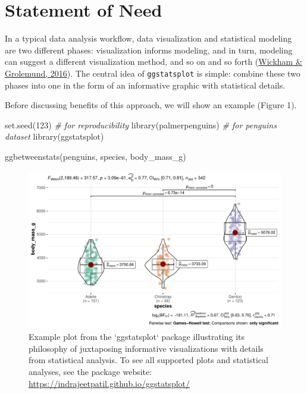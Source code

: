 \documentclass[10pt,a4paper,onecolumn]{article}
\newenvironment{Shaded}{\begin{snugshade}}{\end{snugshade}}
\newcommand{\CommentTok}[1]{\textcolor[rgb]{0.56,0.35,0.01}{\textit{#1}}}
\newcommand{\DecValTok}[1]{\textcolor[rgb]{0.00,0.00,0.81}{#1}}
\newcommand{\FunctionTok}[1]{\textcolor[rgb]{0.00,0.00,0.00}{#1}}
\newcommand{\NormalTok}[1]{#1}
\begin{document}
\hypertarget{statement-of-need}{%
\section{Statement of Need}\label{statement-of-need}}

In a typical data analysis workflow, data visualization and statistical
modeling are two different phases: visualization informs modeling, and
in turn, modeling can suggest a different visualization method, and so
on and so forth (\protect\hyperlink{ref-wickham2016r}{Wickham \&
Grolemund, 2016}). The central idea of \texttt{ggstatsplot} is simple:
combine these two phases into one in the form of an informative graphic
with statistical details.

Before discussing benefits of this approach, we will show an example
(Figure 1).

\begin{Shaded}
\begin{Highlighting}[]
\FunctionTok{set.seed}\NormalTok{(}\DecValTok{123}\NormalTok{) }\CommentTok{\# for reproducibility}
\FunctionTok{library}\NormalTok{(palmerpenguins) }\CommentTok{\# for \textquotesingle{}penguins\textquotesingle{} dataset}
\FunctionTok{library}\NormalTok{(ggstatsplot)}

\FunctionTok{ggbetweenstats}\NormalTok{(penguins, species, body\_mass\_g)}
\end{Highlighting}
\end{Shaded}

\begin{figure}
\includegraphics[width=1\linewidth]{paper_files/figure-latex/penguins-1} \caption{Example plot from the `ggstatsplot` package illustrating its philosophy of juxtaposing informative visualizations with details from statistical analysis. To see all supported plots and statistical analyses, see the package website: \url{https://indrajeetpatil.github.io/ggstatsplot/}}\label{fig:penguins}
\end{figure}
\end{document}
